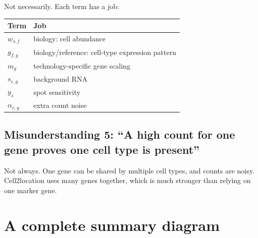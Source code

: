 \documentclass[11pt]{article}
\begin{document}
Not necessarily. Each term has a job:

\begin{center}
\begin{tabular}{ll}
\toprule
Term & Job \\
\midrule
$w_{s,f}$ & biology: cell abundance \\
$g_{f,g}$ & biology/reference: cell-type expression pattern \\
$m_g$ & technology-specific gene scaling \\
$s_{e,g}$ & background RNA \\
$y_s$ & spot sensitivity \\
$\alpha_{e,g}$ & extra count noise \\
\bottomrule
\end{tabular}
\end{center}

\subsection{Misunderstanding 5: ``A high count for one gene proves one cell type is present''}

Not always. One gene can be shared by multiple cell types, and counts are noisy. Cell2location uses many genes together, which is much stronger than relying on one marker gene.

\section{A complete summary diagram}
\end{document}
